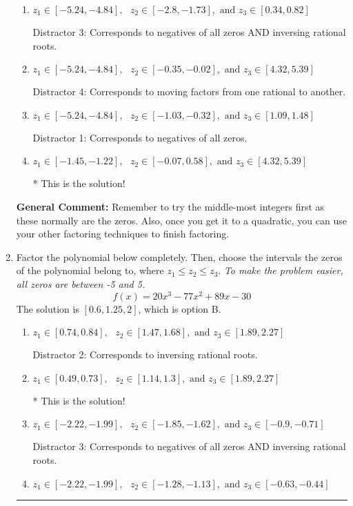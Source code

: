 \documentclass{extbook}[14pt]
\newcommand{\litem}[1]{\item #1

\rule{\textwidth}{0.4pt}}
\begin{document}
\begin{enumerate}
{\begin{enumerate}[label=\Alph*.]
 Distractor 2: Corresponds to inversing rational roots.
\item \( z_1 \in [-5.24, -4.84], \text{   }  z_2 \in [-2.8, -1.73], \text{   and   } z_3 \in [0.34, 0.82] \)

 Distractor 3: Corresponds to negatives of all zeros AND inversing rational roots.
\item \( z_1 \in [-5.24, -4.84], \text{   }  z_2 \in [-0.35, -0.02], \text{   and   } z_3 \in [4.32, 5.39] \)

 Distractor 4: Corresponds to moving factors from one rational to another.
\item \( z_1 \in [-5.24, -4.84], \text{   }  z_2 \in [-1.03, -0.32], \text{   and   } z_3 \in [1.09, 1.48] \)

 Distractor 1: Corresponds to negatives of all zeros.
\item \( z_1 \in [-1.45, -1.22], \text{   }  z_2 \in [-0.07, 0.58], \text{   and   } z_3 \in [4.32, 5.39] \)

* This is the solution!
\end{enumerate}

\textbf{General Comment:} Remember to try the middle-most integers first as these normally are the zeros. Also, once you get it to a quadratic, you can use your other factoring techniques to finish factoring.
}
\litem{
Factor the polynomial below completely. Then, choose the intervals the zeros of the polynomial belong to, where $z_1 \leq z_2 \leq z_3$. \textit{To make the problem easier, all zeros are between -5 and 5.}
\[ f(x) = 20x^{3} -77 x^{2} +89 x -30 \]The solution is \( [0.6, 1.25, 2] \), which is option B.\begin{enumerate}[label=\Alph*.]
\item \( z_1 \in [0.74, 0.84], \text{   }  z_2 \in [1.47, 1.68], \text{   and   } z_3 \in [1.89, 2.27] \)

 Distractor 2: Corresponds to inversing rational roots.
\item \( z_1 \in [0.49, 0.73], \text{   }  z_2 \in [1.14, 1.3], \text{   and   } z_3 \in [1.89, 2.27] \)

* This is the solution!
\item \( z_1 \in [-2.22, -1.99], \text{   }  z_2 \in [-1.85, -1.62], \text{   and   } z_3 \in [-0.9, -0.71] \)

 Distractor 3: Corresponds to negatives of all zeros AND inversing rational roots.
\item \( z_1 \in [-2.22, -1.99], \text{   }  z_2 \in [-1.28, -1.13], \text{   and   } z_3 \in [-0.63, -0.44] \)


\end{enumerate}}
\end{enumerate}
\end{document}
